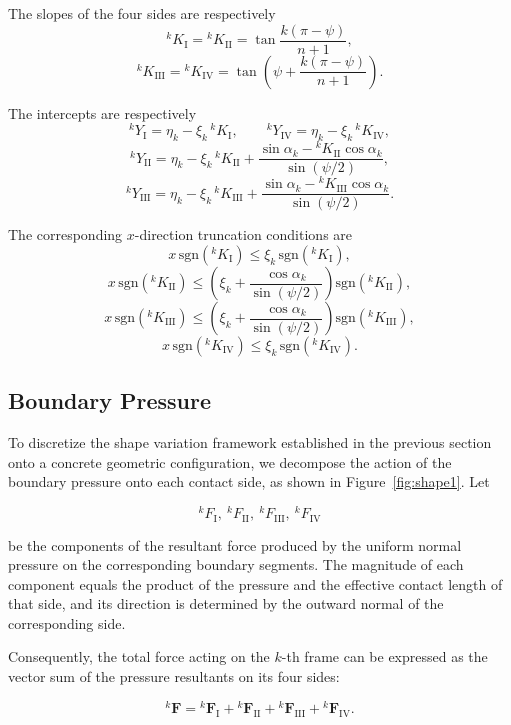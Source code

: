 \documentclass[12pt,a4paper]{article}
\theoremstyle{remark} %
\begin{document}
The slopes of the four sides are respectively
\[
{}^{k}K_{\mathrm I}
={}^kK_{\mathrm{II}}
=\tan\frac{k(\pi-\psi)}{n+1},
\]
\[
{}^{k}K_{\mathrm{III}}
={}^kK_{\mathrm{IV}}
=\tan\!\left(\psi+\frac{k(\pi-\psi)}{n+1}\right).
\]

The intercepts are respectively
\[
{}^{k}Y_{\mathrm I}
=\eta_k-\xi_k\,{}^{k}K_{\mathrm I},
\qquad
{}^{k}Y_{\mathrm{IV}}
=\eta_k-\xi_k\,{}^{k}K_{\mathrm{IV}},
\]
\[
{}^{k}Y_{\mathrm{II}}
=\eta_k-\xi_k\,{}^{k}K_{\mathrm{II}}
+\frac{
\sin\alpha_k-{}^{k}K_{\mathrm{II}}\cos\alpha_k
}{
\sin(\psi/2)
},
\]
\[
{}^{k}Y_{\mathrm{III}}
=\eta_k-\xi_k\,{}^{k}K_{\mathrm{III}}
+\frac{
\sin\alpha_k-{}^{k}K_{\mathrm{III}}\cos\alpha_k
}{
\sin(\psi/2)
}.
\]

The corresponding $x$-direction truncation conditions are
\[
x\,\mathrm{sgn}({}^{k}K_{\mathrm I})
\le
\xi_k\,\mathrm{sgn}({}^{k}K_{\mathrm I}),
\]
\[
x\,\mathrm{sgn}({}^{k}K_{\mathrm{II}})
\le
\left(
\xi_k+\frac{\cos\alpha_k}{\sin(\psi/2)}
\right)
\mathrm{sgn}({}^{k}K_{\mathrm{II}}),
\]
\[
x\,\mathrm{sgn}({}^{k}K_{\mathrm{III}})
\le
\left(
\xi_k+\frac{\cos\alpha_k}{\sin(\psi/2)}
\right)
\mathrm{sgn}({}^{k}K_{\mathrm{III}}),
\]
\[
x\,\mathrm{sgn}({}^{k}K_{\mathrm{IV}})
\le
\xi_k\,\mathrm{sgn}({}^{k}K_{\mathrm{IV}}).
\]

\subsection{Boundary Pressure}

To discretize the shape variation framework established in the previous section onto a concrete geometric configuration, we decompose the action of the boundary pressure onto each contact side, as shown in Figure~\ref{fig:shape1}. Let

\[
{}^{k}F_{\mathrm I},
\ {}^{k}F_{\mathrm{II}},
\ {}^{k}F_{\mathrm{III}},
\ {}^{k}F_{\mathrm{IV}}
\]

be the components of the resultant force produced by the uniform normal pressure on the corresponding boundary segments. The magnitude of each component equals the product of the pressure and the effective contact length of that side, and its direction is determined by the outward normal of the corresponding side.

Consequently, the total force acting on the $k$-th frame can be expressed as the vector sum of the pressure resultants on its four sides:

\[
{}^{k}\mathbf F
=
{}^{k}\mathbf F_{\mathrm I}
+
{}^{k}\mathbf F_{\mathrm{II}}
+
{}^{k}\mathbf F_{\mathrm{III}}
+
{}^{k}\mathbf F_{\mathrm{IV}}.
\]
\end{document}
